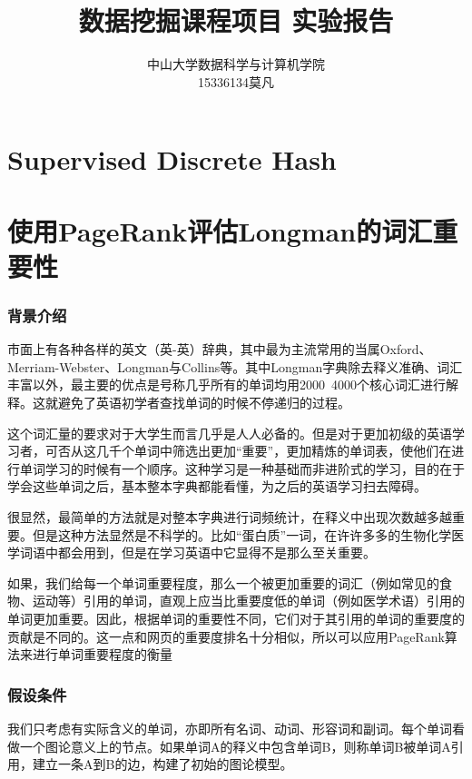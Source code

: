 \documentclass[11pt, a4paper]{article}
\begin{document}
	
\title{数据挖掘课程项目 实验报告}
\author{中山大学\qquad 数据科学与计算机学院\\15336134\quad 莫凡}
\maketitle
\tableofcontents
\newpage


\part{Supervised Discrete Hash}
\newpage

\part{使用PageRank评估Longman的词汇重要性}
\setcounter{section}{0}
\section{背景介绍}
市面上有各种各样的英文（英-英）辞典，其中最为主流常用的当属Oxford、Merriam-Webster、Longman与Collins等。其中Longman字典除去释义准确、词汇丰富以外，最主要的优点是号称几乎所有的单词均用2000~4000个核心词汇进行解释。这就避免了英语初学者查找单词的时候不停递归的过程。

这个词汇量的要求对于大学生而言几乎是人人必备的。但是对于更加初级的英语学习者，可否从这几千个单词中筛选出更加“重要”，更加精炼的单词表，使他们在进行单词学习的时候有一个顺序。这种学习是一种基础而非进阶式的学习，目的在于学会这些单词之后，基本整本字典都能看懂，为之后的英语学习扫去障碍。

很显然，最简单的方法就是对整本字典进行词频统计，在释义中出现次数越多越重要。但是这种方法显然是不科学的。比如“蛋白质”一词，在许许多多的生物化学医学词语中都会用到，但是在学习英语中它显得不是那么至关重要。

如果，我们给每一个单词重要程度，那么一个被更加重要的词汇（例如常见的食物、运动等）引用的单词，直观上应当比重要度低的单词（例如医学术语）引用的单词更加重要。因此，根据单词的重要性不同，它们对于其引用的单词的重要度的贡献是不同的。这一点和网页的重要度排名十分相似，所以可以应用PageRank算法来进行单词重要程度的衡量

\section{假设条件}
我们只考虑有实际含义的单词，亦即所有名词、动词、形容词和副词。每个单词看做一个图论意义上的节点。如果单词A的释义中包含单词B，则称单词B被单词A引用，建立一条A到B的边，构建了初始的图论模型。
\end{document}
